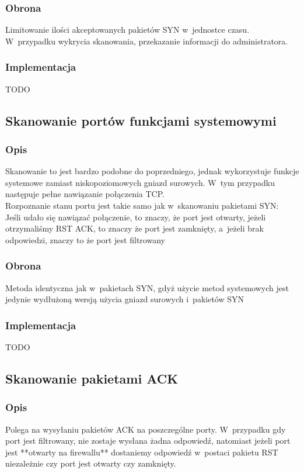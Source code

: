 \documentclass[a4paper,10pt]{article}
\begin{document}
		\subsubsection{Obrona}
			Limitowanie ilości akceptowanych pakietów SYN w~jednostce czasu. W~przypadku wykrycia skanowania, przekazanie informacji do administratora.
		\subsubsection{Implementacja}
			TODO
	\subsection{Skanowanie portów funkcjami systemowymi}
		\subsubsection{Opis}
			Skanowanie to jest bardzo podobne do poprzedniego, jednak wykorzystuje funkcje systemowe zamiast niskopoziomowych gniazd surowych. W~tym przypadku następuje pełne nawiązanie połączenia TCP.\\
			Rozpoznanie stanu portu jest takie samo jak w~skanowaniu pakietami SYN:\\
			Jeśli udało się nawiązać połączenie, to znaczy, że port jest otwarty, jeżeli otrzymaliśmy RST ACK, to znaczy że port jest zamknięty, a~jeżeli brak odpowiedzi, znaczy to że port jest filtrowany
		\subsubsection{Obrona}
			Metoda identyczna jak w~pakietach SYN, gdyż użycie metod systemowych jest jedynie wydłużoną wersją użycia gniazd surowych i~pakietów SYN
		\subsubsection{Implementacja}
			TODO
	\subsection{Skanowanie pakietami ACK}
		\subsubsection{Opis}
			Polega na wysyłaniu pakietów ACK na poszczególne porty. W~przypadku gdy port jest filtrowany, nie zostaje wysłana żadna odpowiedź, natomiast jeżeli port jest **otwarty na firewallu** dostaniemy odpowiedź w~postaci pakietu RST niezależnie czy port jest otwarty czy zamknięty.
\end{document}
